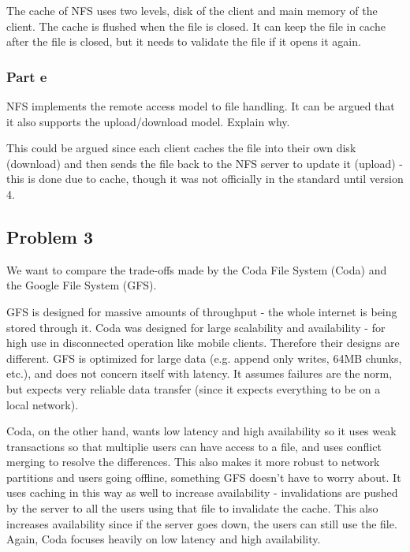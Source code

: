 \documentclass[english]{article}
\begin{document}
The cache of NFS uses two levels, disk of the client and main memory of the client. The cache is flushed when the
file is closed. It can keep the file in cache after the file is closed, but it needs to validate the file if it
opens it again.

\subsubsection*{Part e}
NFS implements the remote access model to file handling. It can be argued that it also supports the upload/download
model. Explain why.

This could be argued since each client caches the file into their own disk (download) and then sends the file back to
the NFS server to update it (upload) - this is done due to cache, though it was not officially in the standard until
version 4. 

\subsection*{Problem 3}
We want to compare the trade-offs made by the Coda File System (Coda) and the Google File System (GFS).

GFS is designed for massive amounts of throughput - the whole internet is being stored through it. Coda was designed
for large scalability and availability - for high use in disconnected operation like mobile clients. Therefore their
designs are different. GFS is optimized for large data (e.g. append only writes, 64MB chunks, etc.), and does not
concern itself with latency. It assumes failures are the norm, but expects very reliable data transfer (since
it expects everything to be on a local network). 

Coda, on the other hand, wants low latency and high availability so it uses weak transactions so that multiplie users
can have access to a file, and uses conflict merging to resolve the differences. This also makes it more robust to
network partitions and users going offline, something GFS doesn't have to worry about. It uses caching in this way
as well to increase availability - invalidations are pushed by the server to all the users using that file to
invalidate the cache. This also increases availability since if the server goes down, the users can still use the
file. Again, Coda focuses heavily on low latency and high availability. 
\end{document}

